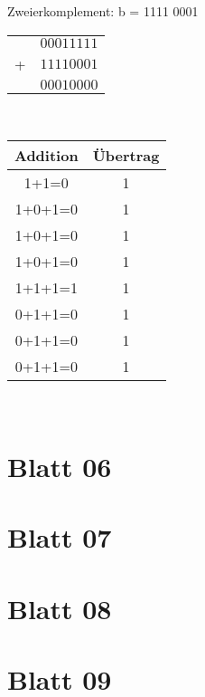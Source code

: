 \documentclass[paper=a4, fontsize=11pt]{scrartcl}
\numberwithin{equation}{section}
\numberwithin{figure}{section}
\numberwithin{table}{section}
\begin{document}
\begin{flushleft}
Zweierkomplement: b = 1111 0001 \\
\begin{tabular}{cr}
	&$ 0001 1111 $	\\
   +&$ 1111 0001$	\\\hline 
   &$  0001 0000$
\end{tabular}\\

\begin{flushleft}
  \begin{tabular}{|c|c|}
  \hline
Addition & Übertrag\\
  \hline
1+1=0 & 1 \\
  \hline
1+0+1=0 & 1 \\
  \hline
1+0+1=0 & 1 \\
  \hline
1+0+1=0 & 1 \\
  \hline
1+1+1=1 & 1 \\
  \hline
0+1+1=0 & 1 \\
  \hline
0+1+1=0 & 1 \\
  \hline
0+1+1=0 & 1 \\
  \hline
  \end{tabular} \\

\newpage

\section{Blatt 06}

\newpage

\section{Blatt 07}

\newpage

\section{Blatt 08}

\newpage

\section{Blatt 09}


\end{flushleft}
\end{flushleft}
\end{document}
